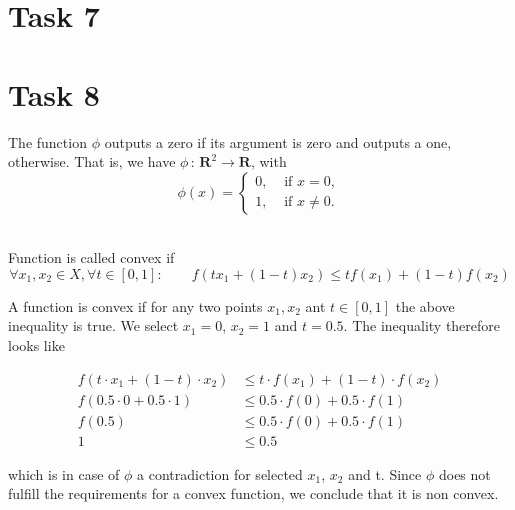 \documentclass[12pt]{article}
\begin{document}
\section{Task 7}

\section{Task 8}
The function $\phi$ outputs a zero if its argument is zero and outputs a one, otherwise. That is, we have $\phi\,:\,{\mathbf R}^2 \rightarrow {\mathbf R}$, with $$\phi(x) = \left\{ \begin{array}{ll} 0,  & \text{ if } x = 0, \\ 1, & \text{ if }x \neq 0. \end{array} \right.$$

\noindent{}\\

Function is called convex if
\begin{equation}
	\forall x_1, x_2 \in X, \forall t \in [0, 1]: \qquad f(tx_1+(1-t)x_2)\leq t f(x_1)+(1-t)f(x_2)
\end{equation}

A function is convex if for any two points $x_{1}, x_{2}$ ant $t\in[0, 1]$ the above inequality is true. We select $x_{1} = 0$, $x_{2} = 1$ and $t=0.5$. The inequality therefore looks like

\begin{equation}
\begin{split}
	f(t \cdot x_1+(1-t) \cdot x_2) &\leq t \cdot f(x_1)+(1-t) \cdot f(x_2)\\
	f(0.5 \cdot 0 + 0.5 \cdot 1) &\leq 0.5 \cdot f(0) + 0.5 \cdot f(1)\\
	f(0.5) &\leq 0.5 \cdot f(0) + 0.5 \cdot f(1)\\
	1 &\leq 0.5
\end{split}
\end{equation}

which is in case of $\phi$ a contradiction for selected $x_{1}$, $x_{2}$ and t. Since $\phi$ does not fulfill the requirements for a convex function, we conclude that it is non convex.

\end{document}
